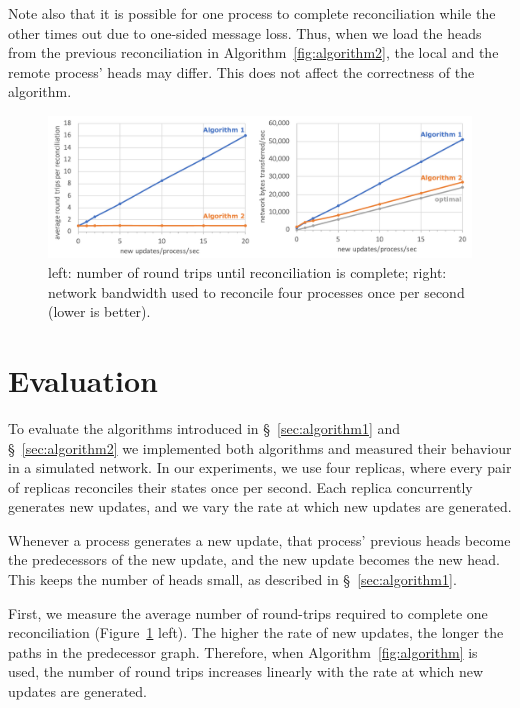 \documentclass[a4paper,anonymous,USenglish]{lipics-v2019}
\begin{document}
Note also that it is possible for one process to complete reconciliation while the other times out due to one-sided message loss.
Thus, when we load the heads from the previous reconciliation in Algorithm~\ref{fig:algorithm2}, the local and the remote process' heads may differ.
This does not affect the correctness of the algorithm.

\begin{figure}
  \includegraphics[width=\textwidth,keepaspectratio=true]{figs/evaluation.pdf}
  \caption{left: number of round trips until reconciliation is complete; right: network bandwidth used to reconcile four processes once per second (lower is better).}
  \label{fig:evaluation}
\end{figure}

\section{Evaluation}\label{sec:evaluation}

To evaluate the algorithms introduced in \S~\ref{sec:algorithm1} and \S~\ref{sec:algorithm2} we implemented both algorithms and measured their behaviour in a simulated network.
In our experiments, we use four replicas, where every pair of replicas reconciles their states once per second.
Each replica concurrently generates new updates, and we vary the rate at which new updates are generated.

Whenever a process generates a new update, that process' previous heads become the predecessors of the new update, and the new update becomes the new head.
This keeps the number of heads small, as described in \S~\ref{sec:algorithm1}.

First, we measure the average number of round-trips required to complete one reconciliation (Figure~\ref{fig:evaluation} left).
The higher the rate of new updates, the longer the paths in the predecessor graph.
Therefore, when Algorithm~\ref{fig:algorithm} is used, the number of round trips increases linearly with the rate at which new updates are generated.
\end{document}
